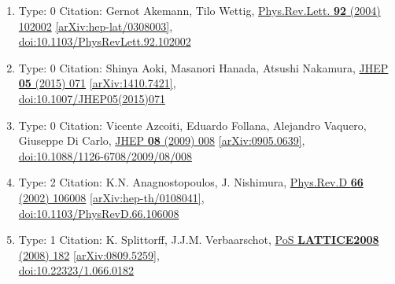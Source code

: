 \documentclass[a4paper,10pt]{article}
\begin{document}
\begin{enumerate}
\begin{enumerate}
  \item Type: 0 Citation: Gernot Akemann, Tilo Wettig, \href{https://www.doi.org/10.1103/PhysRevLett.92.102002}{Phys.Rev.Lett. {\bf 92} (2004) 102002}  \href{https://arxiv.org/abs/hep-lat/0308003}{[arXiv:hep-lat/0308003]},\\\href{https://www.doi.org/10.1103/PhysRevLett.92.102002}{doi:10.1103/PhysRevLett.92.102002}
  \item Type: 0 Citation: Shinya Aoki, Masanori Hanada, Atsushi Nakamura, \href{https://www.doi.org/10.1007/JHEP05(2015)071}{JHEP {\bf 05} (2015) 071}  \href{https://arxiv.org/abs/1410.7421}{[arXiv:1410.7421]},\\\href{https://www.doi.org/10.1007/JHEP05(2015)071}{doi:10.1007/JHEP05(2015)071}
  \item Type: 0 Citation: Vicente Azcoiti, Eduardo Follana, Alejandro Vaquero, Giuseppe Di Carlo, \href{https://www.doi.org/10.1088/1126-6708/2009/08/008}{JHEP {\bf 08} (2009) 008}  \href{https://arxiv.org/abs/0905.0639}{[arXiv:0905.0639]},\\\href{https://www.doi.org/10.1088/1126-6708/2009/08/008}{doi:10.1088/1126-6708/2009/08/008}
  \item Type: 2 Citation: K.N. Anagnostopoulos, J. Nishimura, \href{https://www.doi.org/10.1103/PhysRevD.66.106008}{Phys.Rev.D {\bf 66} (2002) 106008}  \href{https://arxiv.org/abs/hep-th/0108041}{[arXiv:hep-th/0108041]},\\\href{https://www.doi.org/10.1103/PhysRevD.66.106008}{doi:10.1103/PhysRevD.66.106008}
  \item Type: 1 Citation: K. Splittorff, J.J.M. Verbaarschot, \href{https://www.doi.org/10.22323/1.066.0182}{PoS {\bf LATTICE2008} (2008) 182}  \href{https://arxiv.org/abs/0809.5259}{[arXiv:0809.5259]},\\\href{https://www.doi.org/10.22323/1.066.0182}{doi:10.22323/1.066.0182}

\end{enumerate}
\end{enumerate}
\end{document}
